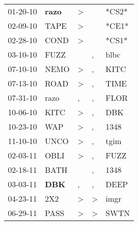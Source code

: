 \begin{supertabular}{p{0.07\textwidth}p{0.06\textwidth}p{0.02\textwidth}p{0.02\textwidth}p{0.06\textwidth}}
 01-20-10\textsuperscript{} &  \textbf{razo\textsuperscript{}} &     \textgreater &                  &                            *CS2* \\
 02-09-10\textsuperscript{} &           TAPE\textsuperscript{} &     \textgreater &                  &                            *CE1* \\
 02-28-10\textsuperscript{} &           COND\textsuperscript{} &     \textgreater &                  &                            *CS1* \\
 03-10-10\textsuperscript{} &           FUZZ\textsuperscript{} &                  &                , &           blbc\textsuperscript{} \\
 07-10-10\textsuperscript{} &           NEMO\textsuperscript{} &     \textgreater &                , &           KITC\textsuperscript{} \\
 07-13-10\textsuperscript{} &           ROAD\textsuperscript{} &     \textgreater &                , &           TIME\textsuperscript{} \\
 07-31-10\textsuperscript{} &           razo\textsuperscript{} &                , &                , &           FLOR\textsuperscript{} \\
 10-06-10\textsuperscript{} &           KITC\textsuperscript{} &     \textgreater &                , &            DBK\textsuperscript{} \\
 10-23-10\textsuperscript{} &            WAP\textsuperscript{} &     \textgreater &                , &           1348\textsuperscript{} \\
 11-10-10\textsuperscript{} &           UNCO\textsuperscript{} &     \textgreater &                , &           tgim\textsuperscript{} \\
 02-03-11\textsuperscript{} &           OBLI\textsuperscript{} &     \textgreater &                , &           FUZZ\textsuperscript{} \\
 02-18-11\textsuperscript{} &           BATH\textsuperscript{} &                  &                , &           1348\textsuperscript{} \\
 03-03-11\textsuperscript{} &   \textbf{DBK\textsuperscript{}} &                , &                , &           DEEP\textsuperscript{} \\
 04-23-11\textsuperscript{} &            2X2\textsuperscript{} &     \textgreater &     \textgreater &           imgr\textsuperscript{} \\
 06-29-11\textsuperscript{} &           PASS\textsuperscript{} &     \textgreater &     \textgreater &           SWTN\textsuperscript{} \\

\end{supertabular}
